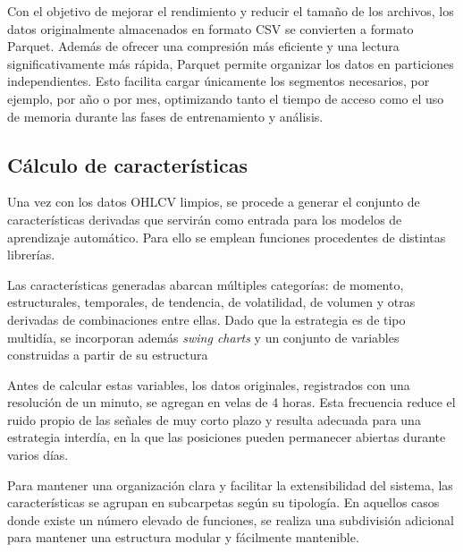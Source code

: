 Con el objetivo de mejorar el rendimiento y reducir el tamaño de los archivos, los datos originalmente almacenados en formato CSV se convierten a
formato Parquet. Además de ofrecer una compresión más eficiente y una lectura significativamente más rápida, Parquet permite organizar los datos en
particiones independientes. Esto facilita cargar únicamente los segmentos necesarios, por ejemplo, por año o por mes, optimizando tanto el tiempo de
acceso como el uso de memoria durante las fases de entrenamiento y análisis.


\subsection{Cálculo de características}

Una vez con los datos OHLCV limpios, se procede a generar el conjunto de características derivadas que servirán como entrada para los modelos de
aprendizaje automático. Para ello se emplean funciones procedentes de distintas librerías.

Las características generadas abarcan múltiples categorías: de momento, estructurales, temporales, de tendencia, de volatilidad, de volumen y otras
derivadas de combinaciones entre ellas. Dado que la estrategia es de tipo multidía, se incorporan además \textit{swing charts} y un conjunto de
variables construidas a partir de su estructura

Antes de calcular estas variables, los datos originales, registrados con una resolución de un minuto, se agregan en velas de 4 horas. Esta frecuencia
reduce el ruido propio de las señales de muy corto plazo y resulta adecuada para una estrategia interdía, en la que las posiciones pueden permanecer
abiertas durante varios días.

Para mantener una organización clara y facilitar la extensibilidad del sistema, las características se agrupan en subcarpetas según su tipología. En
aquellos casos donde existe un número elevado de funciones, se realiza una subdivisión adicional para mantener una estructura modular y fácilmente
mantenible.

